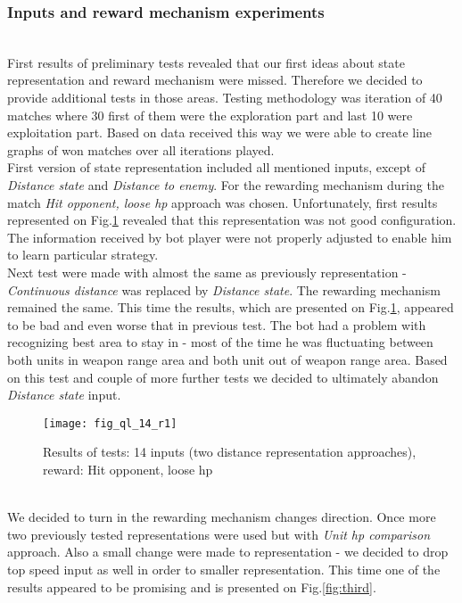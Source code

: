 \subsubsection{Inputs and reward mechanism experiments}\hfill \\ \hphantom{x}
First results of preliminary tests revealed that our first ideas about state representation and reward mechanism were missed. Therefore we decided to provide additional tests in those areas. Testing methodology was iteration of 40 matches where 30 first of them were the exploration part and last 10 were exploitation part. Based on data received this way we were able to create line graphs of won matches over all iterations played. \hfill \\ \hphantom{x}
First version of state representation included all mentioned inputs, except of \emph{Distance state} and \emph{Distance to enemy}. For the rewarding mechanism during the match \emph{Hit opponent, loose hp} approach was chosen. Unfortunately, first results represented on Fig.\ref{fig:first} revealed that this representation was not good configuration. The information received by bot player were not properly adjusted to enable him to learn particular strategy.
\\ \hphantom{x}
Next test were made with almost the same as previously representation - \emph{Continuous distance} was replaced by \emph{Distance state}. The rewarding mechanism remained the same. This time the results, which are presented on Fig.\ref{fig:first}, appeared to be bad and even worse that in previous test. The bot had a problem with recognizing best area to stay in - most of the time he was fluctuating between both units in weapon range area and both unit out of weapon range area. Based on this test and couple of more further tests we decided to ultimately abandon \emph{Distance state} input.
\begin{figure}[htp]
\centerline{\texttt{[image: fig\_ql\_14\_r1]}}
\caption{Results of tests: 14 inputs (two distance representation approaches), reward: Hit opponent, loose hp}
\label{fig:first}
\end{figure}
\\ \hphantom{x}
We decided to turn in the rewarding mechanism changes direction. Once more two previously tested representations were used but with \emph{Unit hp comparison} approach. Also a small change were made to representation - we decided to drop top speed input as well in order to smaller representation. This time one of the results appeared to be promising and is presented on Fig.\ref{fig:third}.

